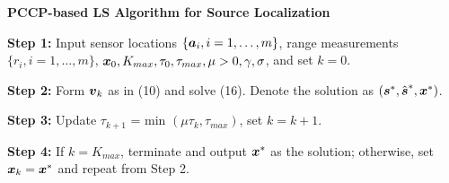 \phantom{m}

\noindent \textbf{PCCP-based LS Algorithm for Source Localization}

\textbf{Step 1:} Input sensor locations $\{\mbox{\boldmath$a$}_i, i = 1,\ldots,m\}$, range measurements $\{r_i, i = 1, \ldots, m\}$, $\mbox{\boldmath$x$}_0, K_{max}, \tau_0, \tau_{max}, \mu > 0, \gamma, \sigma$, and set $k = 0$. 

\textbf{Step 2:} Form  $\mbox{\boldmath$v$}_k$ as in (10) and solve (16). Denote the solution as  $(\mbox{\boldmath$s$}^*, \hat{\mbox{\boldmath$s$}}^*, \mbox{\boldmath$x$}^*)$. 

\textbf{Step 3:} Update  $\tau_{k+1} $ = min $(\mu\tau_k, \tau_{max})$, set $k = k+1$. 

\textbf{Step 4:} If $k = K_{max}$, terminate and output $\mbox{\boldmath$x$}^*$ as the solution; otherwise, set $\mbox{\boldmath$x$}_k = \mbox{\boldmath$x$}^*$ and repeat from Step 2. 

